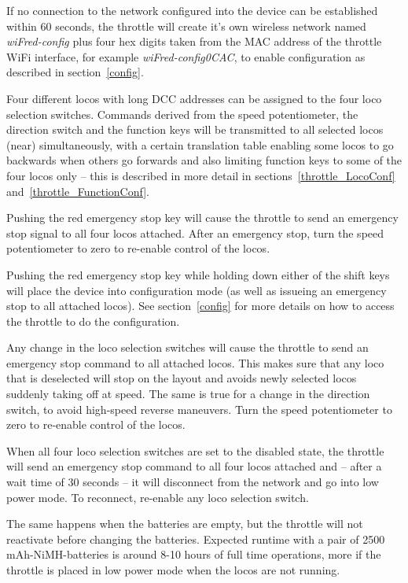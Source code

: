 \documentclass[11pt,a4paper]{scrartcl}
\begin{document}
If no connection to the network configured into the device can be established within 60 seconds, the throttle will create it's own wireless network named \textit{wiFred-config} plus four hex digits taken from the MAC address of the throttle WiFi interface, for example \textit{wiFred-config0CAC}, to enable configuration as described in section~\ref{config}.

Four different locos with long DCC addresses can be assigned to the four loco selection switches. Commands derived from the speed potentiometer, the direction switch and the function keys will be transmitted to all selected locos (near) simultaneously, with a certain translation table enabling some locos to go backwards when others go forwards and also limiting function keys to some of the four locos only -- this is described in more detail in sections~\ref{throttle_LocoConf} and~\ref{throttle_FunctionConf}.

Pushing the red emergency stop key will cause the throttle to send an emergency stop signal to all four locos attached. After an emergency stop, turn the speed potentiometer to zero to re-enable control of the locos.

Pushing the red emergency stop key while holding down either of the shift keys will place the device into configuration mode (as well as issueing an emergency stop to all attached locos). See section~\ref{config} for more details on how to access the throttle to do the configuration.

Any change in the loco selection switches will cause the throttle to send an emergency stop command to all attached locos. This makes sure that any loco that is deselected will stop on the layout and avoids newly selected locos suddenly taking off at speed. The same is true for a change in the direction switch, to avoid high-speed reverse maneuvers. Turn the speed potentiometer to zero to re-enable control of the locos.

When all four loco selection switches are set to the disabled state, the throttle will send an emergency stop command to all four locos attached and -- after a wait time of 30 seconds -- it will disconnect from the network and go into low power mode. To reconnect, re-enable any loco selection switch.

The same happens when the batteries are empty, but the throttle will not reactivate before changing the batteries. Expected runtime with a pair of 2500\,mAh-NiMH-batteries is around 8-10 hours of full time operations, more if the throttle is placed in low power mode when the locos are not running.
\end{document}
